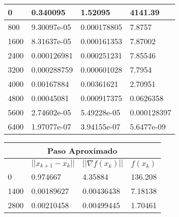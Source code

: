 \documentclass{article}
\begin{document}
\begin{enumerate}
\begin{table}[ht]
{\begin{tabular}{llll}
  \multicolumn{1}{|l|}{0} & \multicolumn{1}{l|}{0.340095} & \multicolumn{1}{l|}{1.52095}  &\multicolumn{1}{l|}{4141.39} \\ \hline
  \multicolumn{1}{|l|}{800} & \multicolumn{1}{l|}{9.30097e-05}  & \multicolumn{1}{l|}{0.000178805}  & \multicolumn{1}{l|}{7.8757} \\ \hline
  \multicolumn{1}{|l|}{1600}  & \multicolumn{1}{l|}{8.31637e-05}  & \multicolumn{1}{l|}{0.000161353}  & \multicolumn{1}{l|}{7.87002} \\ \hline
  \multicolumn{1}{|l|}{2400}  & \multicolumn{1}{l|}{0.000126981}  & \multicolumn{1}{l|}{0.000251231}  & \multicolumn{1}{l|}{7.85546} \\ \hline
  \multicolumn{1}{|l|}{3200}  & \multicolumn{1}{l|}{0.000288759}  & \multicolumn{1}{l|}{0.000601028}  & \multicolumn{1}{l|}{7.7954} \\ \hline
  \multicolumn{1}{|l|}{4000}  & \multicolumn{1}{l|}{0.00167884} & \multicolumn{1}{l|}{0.00361621} & \multicolumn{1}{l|}{2.70951} \\ \hline
  \multicolumn{1}{|l|}{4800}  & \multicolumn{1}{l|}{0.00045081} & \multicolumn{1}{l|}{0.000917375}  & \multicolumn{1}{l|}{0.0626358} \\ \hline
  \multicolumn{1}{|l|}{5600}  & \multicolumn{1}{l|}{2.74602e-05}  & \multicolumn{1}{l|}{5.49228e-05}  & \multicolumn{1}{l|}{0.000128397} \\ \hline
  \multicolumn{1}{|l|}{6400}  & \multicolumn{1}{l|}{1.97077e-07}  & \multicolumn{1}{l|}{3.94155e-07}  & \multicolumn{1}{l|}{5.6477e-09} \\ \hline
  \end{tabular}
  \begin{tabular}{llll}
  \multicolumn{4}{c}{Paso Aproximado} \\ \hline
  \rowcolor[HTML]{DBDBDB} 
  \multicolumn{1}{|l|}{\cellcolor[HTML]{DBDBDB}k} & \multicolumn{1}{l|}{\cellcolor[HTML]{DBDBDB}$||x_{k+1} - x_k||$} & \multicolumn{1}{l|}{\cellcolor[HTML]{DBDBDB}$||\nabla f (x_k )||$}       & \multicolumn{1}{l|}{\cellcolor[HTML]{DBDBDB}$f(x_k)$} \\ \hline
  \multicolumn{1}{|l|}{0} & \multicolumn{1}{l|}{0.974667} & \multicolumn{1}{l|}{4.35884}  &\multicolumn{1}{l|}{136.208} \\ \hline
  \multicolumn{1}{|l|}{1400}  & \multicolumn{1}{l|}{0.00189627} & \multicolumn{1}{l|}{0.00436438} & \multicolumn{1}{l|}{7.18138} \\ \hline
  \multicolumn{1}{|l|}{2800}  & \multicolumn{1}{l|}{0.00210458} & \multicolumn{1}{l|}{0.00499445} & \multicolumn{1}{l|}{1.70461} \\ \hline

\end{tabular}}
\end{table}
\end{enumerate}
\end{document}
